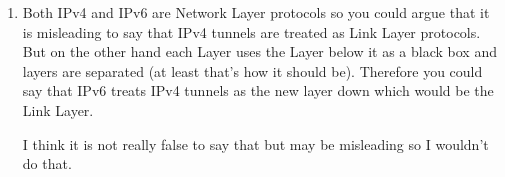 \documentclass[12pt, a4paper]{article}
\begin{document}
\begin{enumerate}[1]
	\item %
	Both IPv4 and IPv6 are Network Layer protocols so you could argue that it is misleading to say that IPv4 tunnels are treated as Link Layer protocols. But on the other hand each Layer uses the Layer below it as a black box and layers are separated (at least that's how it should be). Therefore you could say that IPv6 treats IPv4 tunnels as the new layer down which would be the Link Layer.

	I think it is not really false to say that but may be misleading so I wouldn't do that.
\end{enumerate}
\end{document}
